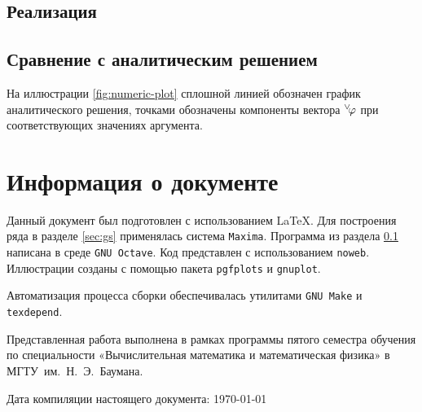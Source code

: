 \documentclass[11pt]{article}
\numberwithin{equation}{section}
\renewcommand{\phi}{\varphi}
\renewcommand{\vec}[1]{{}^{\vee}\negmedspace#1}
\providecommand{\program}[1]{{\tt #1}}
\begin{document}
\clearpage
\subsection{Реализация}
\label{sec:numerical-implementation}



\subsection{Сравнение с аналитическим решением}
\label{sec:comparison}

На иллюстрации \ref{fig:numeric-plot} сплошной линией обозначен график
аналитического решения, точками обозначены компоненты вектора
$\vec{\phi}$ при соответствующих значениях аргумента.



\clearpage
\appendix
\section{Информация о документе}

Данный документ был подготовлен с использованием \LaTeX{}. Для
построения ряда в разделе \ref{sec:gs} применялась система
\program{Maxima}. Программа из раздела
\ref{sec:numerical-implementation} написана в среде
\program{GNU Octave}. Код представлен с использованием
\program{noweb}. Иллюстрации созданы с помощью пакета
\program{pgfplots} и \program{gnuplot}.

Автоматизация процесса сборки обеспечивалась утилитами
\program{GNU Make} и \program{texdepend}.

Представленная работа выполнена в рамках программы пятого семестра
обучения по специальности «Вычислительная математика и математическая
физика» в МГТУ им. Н. Э. Баумана.

Дата компиляции настоящего документа: \today



\end{document}

